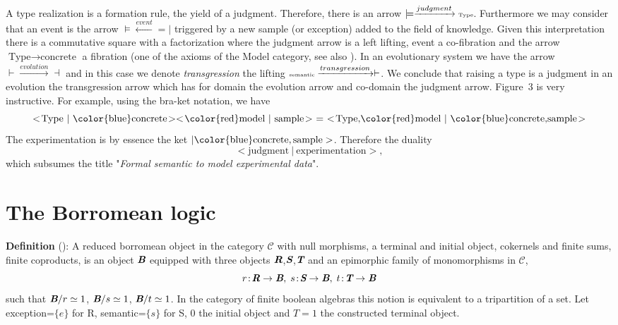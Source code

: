 A type realization is a formation rule, the yield of a judgment. Therefore, there is an arrow $\models\xrightarrow{judgment}\text{\tiny Type}$. Furthermore we may consider that an event is the arrow $\models\xleftarrow{event}=\!\!\!|$ triggered by a new sample (or exception) added to the field of knowledge. Given this interpretation there is a commutative square with a factorization where the judgment arrow is a left lifting, event a co-fibration and the arrow  $\text{Type}\rightarrow\text{concrete}$ a fibration (one of the axioms of the Model category, see also \cite{awodey_2009}). In an evolutionary system we have the arrow $\overset{}{\vdash}\xrightarrow{evolution}\overset{}{\dashv}$ and in this case we denote {\it transgression} the lifting $\overset{}{\text{\tiny semantic}}\xrightarrow{transgression}\overset{}{\vdash}$. We conclude that raising a type is a judgment in an evolution the transgression arrow which has for domain the evolution arrow and co-domain the judgment arrow. Figure~3 is very instructive. For example, using the bra-ket notation, we have \begin{displaymath}
<\!\text{Type}~|~\text{\color{blue}concrete}\!
><\!\text{\color{red}model}~|~\text{sample}\!>~ =~ 
<\!\text{Type,{\color{red}model}}~|~\text{{\color{blue}concrete},sample}\!>
\end{displaymath}
The experimentation is by essence the ket $|\text{\color{blue}concrete},\text{sample}>$. Therefore the duality 
\begin{displaymath}
<\!\text{judgment}~|~\text{experimentation}\!>,
\end{displaymath}
which subsumes the title "{\it Formal semantic to model experimental data}".

\section{The Borromean logic}
{\bf Definition} (\cite{guitart_2012}): A reduced borromean object in the category $\mathcal{C}$ with null morphisms, a terminal and initial object, cokernels and finite sums, finite coproducts, is an object $\textbf{\em {B}}$ equipped with three objects $\textbf{\em {R}}$,$\textbf{\em {S}}$,$\textbf{\em {T}}$ and an epimorphic family of monomorphisms in  $\mathcal{C}$,
\begin{displaymath}
	r\!:\!\textbf{\em {R}}\rightarrow\textbf{\em {B}},\; s\!:\!\textbf{\em {S}}\rightarrow\textbf{\em {B}},\; t\!:\!\textbf{\em {T}}\rightarrow\textbf{\em {B}}
\end{displaymath}
such that 
$\textbf{\em {B}}/r\simeq 1$,  
$\textbf{\em {B}}/s\simeq 1$,
$\textbf{\em {B}}/t\simeq 1$. In the category of finite boolean algebras this notion is equivalent to a tripartition of a set. Let exception=$\{e\}$ for R, semantic=$\{s\}$ for S, 0 the initial object and $T=1$ the constructed terminal object.

